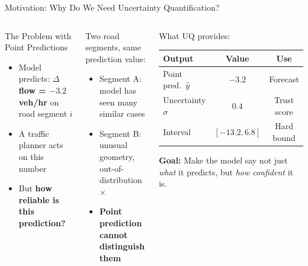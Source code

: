 \documentclass[aspectratio=169,10pt]{beamer}
\newcommand{\emphblue}[1]{\textcolor{tumblue}{\textbf{#1}}}
\newcommand{\emphred}[1]{\textcolor{tumred}{\textbf{#1}}}
\newcommand{\tick}{\textcolor{tumgreen}{\checkmark}}
\newcommand{\cross}{\textcolor{tumred}{$\times$}}
\begin{document}
\begin{frame}{Motivation: Why Do We Need Uncertainty Quantification?}
  \begin{columns}[c]
      \begin{block}{The Problem with Point Predictions}
        \begin{itemize}
          \item Model predicts: \emphblue{$\Delta$flow = $-3.2$ veh/hr} on road segment $i$
          \item A traffic planner acts on this number
          \item But \emphred{how reliable is this prediction?}
        \end{itemize}
      \end{block}
      \vspace{0.4em}
      \begin{alertblock}{Two road segments, same prediction value:}
        \begin{itemize}
          \item Segment A: model has seen many similar cases \tick
          \item Segment B: unusual geometry, out-of-distribution \cross
          \item \textbf{Point prediction cannot distinguish them}
        \end{itemize}
      \end{alertblock}
      \begin{exampleblock}{What UQ provides:}
        \vspace{0.2em}
        \centering
        \begin{tabular}{lcc}
          \toprule
          \textbf{Output} & \textbf{Value} & \textbf{Use} \\
          \midrule
          Point pred.\ $\hat{y}$ & $-3.2$ & Forecast \\
          Uncertainty $\sigma$ & $0.4$ & Trust score \\
          Interval & $[-13.2, 6.8]$ & Hard bound \\
          \bottomrule
        \end{tabular}
        \vspace{0.5em}

        \emphblue{Goal:} Make the model say not just \emph{what} it predicts, but \emph{how confident} it is.
      \end{exampleblock}
  \end{columns}
\end{frame}
\end{document}
